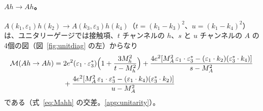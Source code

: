\documentclass[a4paper,10pt]{ltjsarticle}
\begin{document}
\paragraph{$Ah\to Ah$。}$A(k_1,\varepsilon_1)h(k_2)\to A(k_3,\varepsilon_3)h(k_4)$（$t=(k_1-k_3)^2$、$u=(k_1-k_4)^2$）は、ユニタリーゲージでは接触項、$t$ チャンネルの $h$、$s$ と $u$ チャンネルの $A$ の4個の図（図~\ref{fig:unitdiag} の左）からなり
\begin{equation}
\begin{aligned}
\mathcal M(Ah\to Ah)={}&2e^2(\varepsilon_1\cdot\varepsilon_3^*)\Bigl(1+\frac{3M_h^2}{t-M_h^2}\Bigr)
+\frac{4e^2[M_A^2\,\varepsilon_1\cdot\varepsilon_3^*-(\varepsilon_1\cdot k_2)(\varepsilon_3^*\cdot k_4)]}{s-M_A^2}\\
&+\frac{4e^2[M_A^2\,\varepsilon_1\cdot\varepsilon_3^*-(\varepsilon_1\cdot k_4)(\varepsilon_3^*\cdot k_2)]}{u-M_A^2}
\end{aligned}
\label{eq:Mah}
\end{equation}
である（式~\eqref{eq:Mahh} の交差。\ref{app:unitarity}）。
\end{document}
